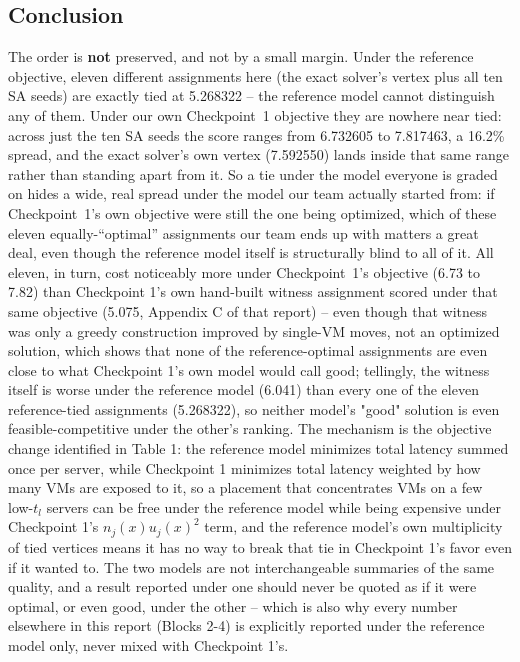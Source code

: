 \documentclass[11pt,a4paper]{article}
\begin{document}
\subsection*{Conclusion}
The order is \textbf{not} preserved, and not by a small margin. Under the reference objective, eleven different assignments here (the exact solver's vertex plus all ten SA seeds) are exactly tied at 5.268322 -- the reference model cannot distinguish any of them. Under our own Checkpoint~1 objective they are nowhere near tied: across just the ten SA seeds the score ranges from 6.732605 to 7.817463, a 16.2\% spread, and the exact solver's own vertex (7.592550) lands inside that same range rather than standing apart from it. So a tie under the model everyone is graded on hides a wide, real spread under the model our team actually started from: if Checkpoint~1's own objective were still the one being optimized, which of these eleven equally-``optimal'' assignments our team ends up with matters a great deal, even though the reference model itself is structurally blind to all of it. All eleven, in turn, cost noticeably more under Checkpoint~1's objective (6.73 to 7.82) than Checkpoint 1's own hand-built witness assignment scored under that same objective (5.075, Appendix C of that report) -- even though that witness was only a greedy construction improved by single-VM moves, not an optimized solution, which shows that none of the reference-optimal assignments are even close to what Checkpoint 1's own model would call good; tellingly, the witness itself is worse under the reference model (6.041) than every one of the eleven reference-tied assignments (5.268322), so neither model's "good" solution is even feasible-competitive under the other's ranking. The mechanism is the objective change identified in Table 1: the reference model minimizes total latency summed once per server, while Checkpoint 1 minimizes total latency weighted by how many VMs are exposed to it, so a placement that concentrates VMs on a few low-$t_l$ servers can be free under the reference model while being expensive under Checkpoint 1's $n_j(x)u_j(x)^2$ term, and the reference model's own multiplicity of tied vertices means it has no way to break that tie in Checkpoint 1's favor even if it wanted to. The two models are not interchangeable summaries of the same quality, and a result reported under one should never be quoted as if it were optimal, or even good, under the other -- which is also why every number elsewhere in this report (Blocks 2-4) is explicitly reported under the reference model only, never mixed with Checkpoint 1's.
\end{document}
